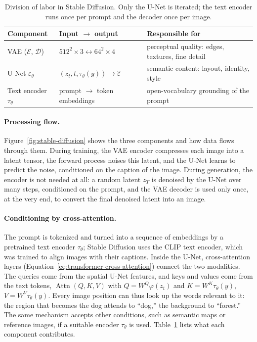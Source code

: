 \begin{table}[ht]
  \centering
  \begin{tabular}{@{}p{3.1cm}p{4.3cm}p{6.3cm}@{}}
    \toprule
    Component & Input $\to$ output & Responsible for \\
    \midrule
    VAE ($\mathcal E$, $\mathcal D$) & $512^2\times3 \leftrightarrow 64^2\times4$ &
      perceptual quality: edges, textures, fine detail \\
    U-Net $\varepsilon_\theta$ & $(z_t,t,\tau_\theta(y))\to\hat\varepsilon$ &
      semantic content: layout, identity, style \\
    Text encoder $\tau_\theta$ & prompt $\to$ token embeddings & open-vocabulary
      grounding of the prompt \\
    \bottomrule
  \end{tabular}
  \caption{Division of labor in Stable Diffusion. Only the U-Net is iterated;
  the text encoder runs once per prompt and the decoder once per image.}
  \label{tab:sd-components}
\end{table}

\paragraph{Processing flow.}
Figure~\ref{fig:stable-diffusion} shows the three components and how data
flows through them. During training, the VAE encoder compresses each image
into a latent tensor, the forward process noises this latent, and the U-Net
learns to predict the noise, conditioned on the caption of the image. During
generation, the encoder is not needed at all: a random latent $z_T$ is
denoised by the U-Net over many steps, conditioned on the prompt, and the VAE
decoder is used only once, at the very end, to convert the final denoised
latent into an image.

\paragraph{Conditioning by cross-attention.}
The prompt is tokenized and turned into a sequence of embeddings by a
pretrained text encoder $\tau_\theta$; Stable Diffusion uses the CLIP text
encoder, which was trained to align images with their captions. Inside the
U-Net, cross-attention layers (Equation~\ref{eq:transformer-cross-attention})
connect the two modalities. The queries come from the spatial U-Net features,
and keys and values come from the text tokens,
$\operatorname{Attn}(Q,K,V)$ with $Q=W^Q\varphi(z_t)$ and
$K=W^K\tau_\theta(y)$, $V=W^V\tau_\theta(y)$. Every image position can thus
look up the words relevant to it: the region that becomes the dog attends to
``dog,'' the background to ``forest.'' The same mechanism accepts other
conditions, such as semantic maps or reference images, if a suitable encoder
$\tau_\theta$ is used. Table~\ref{tab:sd-components} lists what each
component contributes.

